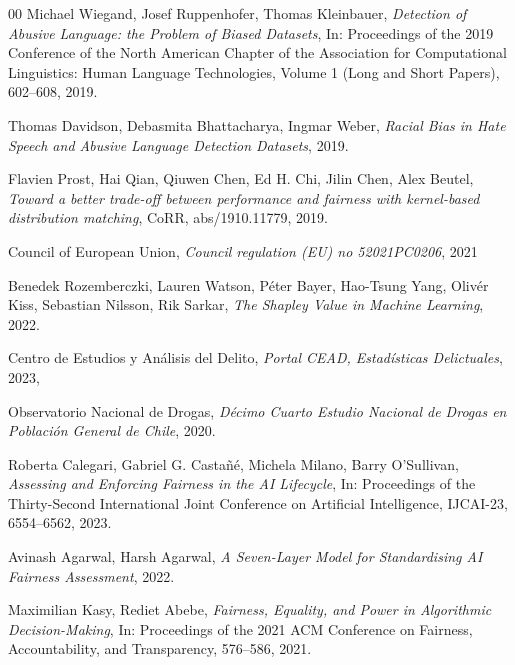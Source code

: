 \documentclass[fleqn,10pt]{wlscirep}
\begin{document}
\begin{thebibliography}{00}
  Michael Wiegand, Josef Ruppenhofer, Thomas Kleinbauer,
  \textit{{D}etection of {A}busive {L}anguage: the {P}roblem of {B}iased {D}atasets},
  In: Proceedings of the 2019 Conference of the North {A}merican Chapter of the Association for Computational Linguistics: Human Language Technologies, Volume 1 (Long and Short Papers),
  602--608,
  2019.


  Thomas Davidson, Debasmita Bhattacharya, Ingmar Weber,
  \textit{Racial Bias in Hate Speech and Abusive Language Detection Datasets},
  2019.


  Flavien Prost, Hai Qian, Qiuwen Chen, Ed H. Chi, Jilin Chen, Alex Beutel,
  \textit{Toward a better trade-off between performance and fairness with kernel-based distribution matching},
  CoRR,
  abs/1910.11779,
  2019.


  {Council of European Union},
  \textit{Council regulation ({EU}) no 52021PC0206},
  {2021}   %


  Benedek Rozemberczki, Lauren Watson, Péter Bayer, Hao-Tsung Yang, Olivér Kiss, Sebastian Nilsson, Rik Sarkar,
  \textit{The Shapley Value in Machine Learning},
  2022.


  {Centro de Estudios y Análisis del Delito},
  \textit{Portal CEAD, Estadísticas Delictuales},
  {2023},   %


  {Observatorio Nacional de Drogas},
  \textit{D\'ecimo Cuarto Estudio Nacional de Drogas en Poblaci\'on General de Chile},
  2020.


  Roberta Calegari, Gabriel G. Castañé, Michela Milano, Barry O'Sullivan,
  \textit{Assessing and Enforcing Fairness in the AI Lifecycle},
  In: Proceedings of the Thirty-Second International Joint Conference on Artificial Intelligence, {IJCAI-23},
  6554--6562,
  2023.


  Avinash Agarwal, Harsh Agarwal,
  \textit{A Seven-Layer Model for Standardising AI Fairness Assessment},
  2022.


  Maximilian Kasy, Rediet Abebe,
  \textit{Fairness, Equality, and Power in Algorithmic Decision-Making},
  In: Proceedings of the 2021 ACM Conference on Fairness, Accountability, and Transparency,
  576–586,
  2021.
\end{thebibliography}
\clearpage
\end{document}
